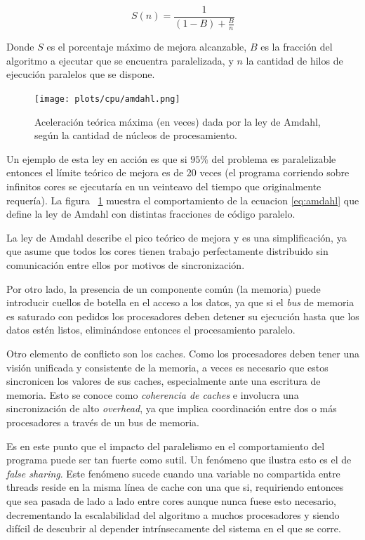 \begin{equation}
    \label{eq:amdahl}
    S(n) = \frac{1}{(1 - B) + \frac{B}{n}}
\end{equation}

Donde $S$ es el porcentaje m\'aximo de mejora alcanzable, $B$ es la fracci\'on del algoritmo a ejecutar que se encuentra
paralelizada, y $n$ la cantidad de hilos de ejecuci\'on paralelos que se dispone.

\begin{figure}[htbp]
    \centering
    \texttt{[image: plots/cpu/amdahl.png]}
    \caption{Aceleraci\'on te\'orica m\'axima (en veces) dada por la ley de Amdahl, seg\'un la cantidad de n\'ucleos de procesamiento.}
    \label{fig:amdahl_plot}
\end{figure}

Un ejemplo de esta ley en acci\'on es que si $95 \%$ del problema es paralelizable entonces el l\'imite te\'orico de
mejora es de 20 veces (el programa corriendo sobre infinitos cores se ejecutar\'ia en un veinteavo del tiempo que originalmente
requer\'ia). La figura ~\ref{fig:amdahl_plot} muestra el comportamiento de la ecuacion \ref{eq:amdahl} que define la ley de Amdahl
con distintas fracciones de c\'odigo paralelo.

La ley de Amdahl describe el pico te\'orico de mejora y es una simplificaci\'on, ya que asume que todos los cores tienen
trabajo perfectamente distribuido sin comunicaci\'on entre ellos por motivos de sincronizaci\'on.

Por otro lado, la presencia de un componente com\'un (la memoria) puede introducir cuellos de botella en el acceso a los
datos, ya que si el \textit{bus} de memoria es saturado con pedidos los procesadores deben detener su ejecuci\'on hasta que
los datos est\'en listos, elimin\'andose entonces el procesamiento paralelo.

Otro elemento de conflicto son los caches. Como los procesadores deben tener una visi\'on unificada y consistente de la
memoria, a veces es necesario que estos sincronicen los valores de sus caches, especialmente ante una escritura de memoria.
Esto se conoce como \textit{coherencia de caches} e involucra una sincronizaci\'on de alto \textit{overhead}, ya
que implica coordinaci\'on entre dos o m\'as procesadores a trav\'es de un bus de memoria.

Es en este punto que el impacto del paralelismo en el comportamiento del programa puede ser tan fuerte como sutil. Un fen\'omeno que
ilustra esto es el de \textit{false sharing}. Este fen\'omeno sucede cuando una variable no compartida entre threads
reside en la misma l\'inea de cache con una que si, requiriendo entonces que sea pasada de lado a lado entre cores aunque
nunca fuese esto necesario, decrementando la escalabilidad del algoritmo a muchos procesadores y siendo
dif\'icil de descubrir al depender intr\'insecamente del sistema en el que se corre.

